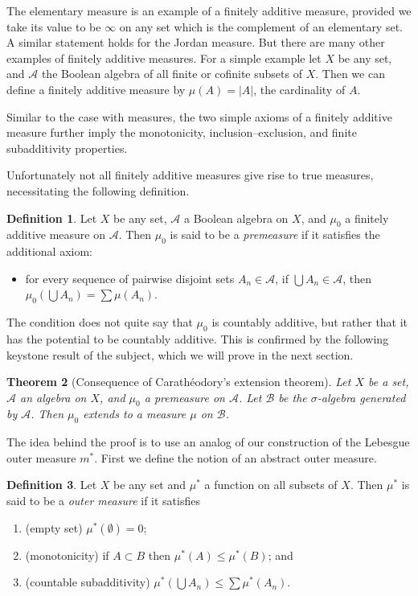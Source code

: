 \documentclass[10pt,oneside]{amsbook}
\theoremstyle{definition}
\theoremstyle{plain}
\newtheorem{thm}{Theorem}[section]
\theoremstyle{definition}
\newtheorem{defn}[thm]{Definition}
\theoremstyle{remark}
\numberwithin{equation}{section}
\numberwithin{figure}{section}
\begin{document}
The elementary measure is an example of a finitely additive measure, provided we take its value to be $\infty$ on any set which is the complement of an elementary set. A similar statement holds for the Jordan measure. But there are many other examples of finitely additive measures. For a simple example let $X$ be any set, and $\mathcal A$ the Boolean algebra of all finite or cofinite subsets of $X$. Then we can define a finitely additive measure by $\mu(A)=|A|$, the cardinality of $A$.

Similar to the case with measures, the two simple axioms of a finitely additive measure further imply the monotonicity, inclusion--exclusion, and finite subadditivity properties.

Unfortunately not all finitely additive measures give rise to true measures, necessitating the following definition.

\begin{defn}
  Let $X$ be any set, $\mathcal A$ a Boolean algebra on $X$, and $\mu_0$ a finitely additive measure on $\mathcal A$. Then $\mu_0$ is said to be a \emph{premeasure} if it satisfies the additional axiom:
  \begin{itemize}
  \item for every sequence of pairwise disjoint sets $A_n\in\mathcal A$, if $\bigcup A_n\in\mathcal A$, then $\mu_0(\bigcup A_n)=\sum\mu(A_n)$.
  \end{itemize}
\end{defn}

The condition does not quite say that $\mu_0$ is countably additive, but rather that it has the potential to be countably additive. This is confirmed by the following keystone result of the subject, which we will prove in the next section.

\begin{thm}[Consequence of Carath\'eodory's extension theorem]
  Let $X$ be a set, $\mathcal A$ an algebra on $X$, and $\mu_0$ a premeasure on $\mathcal A$. Let $\mathcal B$ be the $\sigma$-algebra generated by $\mathcal A$. Then $\mu_0$ extends to a measure $\mu$ on $\mathcal B$.
\end{thm}

The idea behind the proof is to use an analog of our construction of the Lebesgue outer measure $m^*$. First we define the notion of an abstract outer measure.

\begin{defn}
  Let $X$ be any set and $\mu^*$ a function on all subsets of $X$. Then $\mu^*$ is said to be a \emph{outer measure} if it satisfies
  \begin{enumerate}
  \item (empty set) $\mu^*(\emptyset)=0$;
  \item (monotonicity) if $A\subset B$ then $\mu^*(A)\leq\mu^*(B)$; and
  \item (countable subadditivity) $\mu^*(\bigcup A_n)\leq\sum\mu^*(A_n)$.
  \end{enumerate}
\end{defn}
\end{document}
